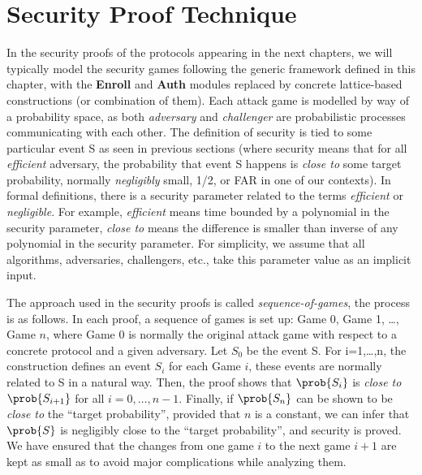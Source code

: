 \section{Security Proof Technique}
In the security proofs of the protocols appearing in the next chapters, we will typically
model the security games following the generic framework defined in this
chapter, with the \textbf{Enroll} and \textbf{Auth} modules replaced by concrete
lattice-based constructions (or combination of them). Each attack game is
modelled by way of a probability space, as both \textit{adversary} and
\textit{challenger} are probabilistic processes communicating with each other. The
definition of security is tied to some particular event S as seen in previous
sections (where security means that for all \textit{efficient} adversary, the
probability that event S happens is \textit{close to} some target probability,
normally \textit{negligibly} small, 1/2, or FAR in one of our contexts). In
formal definitions, there is a security parameter related to the terms
\textit{efficient} or \textit{negligible}. For example, \textit{efficient} means
time bounded by a polynomial in the security parameter, \textit{close to} means
the difference is smaller than inverse of any polynomial in the security
parameter. For simplicity, we assume that all algorithms, adversaries,
challengers, etc., take this parameter value as an implicit input.

The approach used in the security proofs is called \textit{sequence-of-games},
the process is as follows. In each proof,  a sequence of games is set up:
Game 0, Game 1, \dots, Game $n$, where Game 0 is normally the original attack
game with respect to a concrete protocol and a given adversary. Let $S_{0}$ be
the event S. For i=1,\dots,n, the construction defines an event $S_{i}$ for each
Game $i$, these events are normally related to S in a natural way. Then, the
proof shows that $\prob{S_{i}}$ is \textit{close to} $\prob{S_{i+1}}$ for all
$i=0,\dots,n-1$. Finally, if $\prob{S_{n}}$ can be shown to be \textit{close to}
the ``target probability'', provided that $n$ is a constant, we can infer that
$\prob{S}$ is negligibly close to the ``target probability'', and security is
proved. We have ensured that the changes from one game $i$ to the next game
$i+1$ are kept as small as to avoid major complications while analyzing them.

